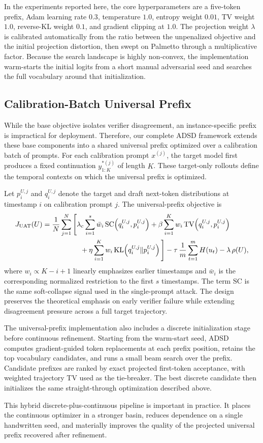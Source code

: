 In the experiments reported here, the core hyperparameters are a five-token
prefix, Adam learning rate $0.3$, temperature $1.0$, entropy weight $0.01$, TV
weight $1.0$, reverse-KL weight $0.1$, and gradient clipping at $1.0$. The
projection weight $\lambda$ is calibrated automatically from the ratio between
the unpenalized objective and the initial projection distortion, then swept on
Palmetto through a multiplicative factor. Because the search landscape is
highly non-convex, the implementation warm-starts the initial logits from a
short manual adversarial seed and searches the full vocabulary around that
initialization.

\subsection{Calibration-Batch Universal Prefix}

While the base objective isolates verifier disagreement, an
instance-specific prefix is impractical for deployment. Therefore, our
complete ADSD framework extends these base components into a shared universal
prefix optimized over a calibration batch of prompts. For each calibration
prompt $x^{(j)}$, the target model first produces a fixed continuation
$y^{*(j)}_{1:K}$ of length $K$. These target-only rollouts define the temporal
contexts on which the universal prefix is optimized.

Let $p_i^{U,j}$ and $q_i^{U,j}$ denote the target and draft next-token
distributions at timestamp $i$ on calibration prompt $j$. The universal-prefix
objective is
\begin{align*}
J_{\mathrm{UAT}}(U) ={}&
\frac{1}{N}\sum_{j=1}^{N}
\Bigg[
\lambda_c \sum_{i=1}^{s} \bar{w}_i\,
\mathrm{SC}\!\left(q_i^{U,j}, p_i^{U,j}\right)
+ \beta \sum_{i=1}^{K} w_i\,\mathrm{TV}\!\left(q_i^{U,j}, p_i^{U,j}\right)
\\
&\qquad\qquad
+ \eta \sum_{i=1}^{K} w_i\,\mathrm{KL}\!\left(q_i^{U,j} \Vert p_i^{U,j}\right)
\Bigg]
- \tau \,\frac{1}{m}\sum_{t=1}^{m} H(u_t)
- \lambda \,\rho(U),
\end{align*}
where $w_i \propto K-i+1$ linearly emphasizes earlier timestamps and
$\bar{w}_i$ is the corresponding normalized restriction to the first $s$
timestamps. The term $\mathrm{SC}$ is the same soft-collapse signal used in the
single-prompt attack. The design preserves the theoretical emphasis on early
verifier failure while extending disagreement pressure across a full target
trajectory.

The universal-prefix implementation also includes a discrete initialization
stage before continuous refinement. Starting from the warm-start seed, ADSD
computes gradient-guided token replacements at each prefix position, retains
the top vocabulary candidates, and runs a small beam search over the prefix.
Candidate prefixes are ranked by exact projected first-token acceptance, with
weighted trajectory TV used as the tie-breaker. The best discrete candidate
then initializes the same straight-through optimization described above.

This hybrid discrete-plus-continuous pipeline is important in practice. It
places the continuous optimizer in a stronger basin, reduces dependence on a
single handwritten seed, and materially improves the quality of the projected
universal prefix recovered after refinement.
